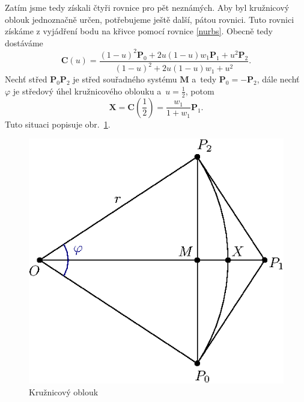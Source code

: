 Zatím jsme tedy získali čtyři rovnice pro pět neznámých. Aby byl kružnicový oblouk jednoznačně určen, potřebujeme ještě další, pátou rovnici. Tuto rovnici získáme z vyjádření bodu na křivce pomocí rovnice \eqref{nurbs}. Obecně tedy dostáváme
\begin{equation}
	\mathbf{C}\left(u\right)=\frac{\left(1-u\right)^2\mathbf{P}_0+2u\left(1-u\right)w_1\mathbf{P}_1+u^2\mathbf{P}_2}{\left(1-u\right)^2+2u\left(1-u\right)w_1+u^2}.
\end{equation}
Nechť střed $\mathbf{P}_0\mathbf{P}_2$ je střed souřadného systému $\mathbf{M}$ a~tedy $\mathbf{P}_0=-\mathbf{P}_2$, dále nechť $\varphi$ je středový úhel kružnicového oblouku a~$u=\frac{1}{2}$, potom
\begin{equation}\label{X=C(1/2)}
	\mathbf{X}=\mathbf{C}\left(\frac{1}{2}\right)=\frac{w_1}{1+w_1}\mathbf{P}_1.
\end{equation}
Tuto situaci popisuje obr.~\ref{oblouk}.
\begin{figure}[!h]
	\begin{center}
	   \includegraphics*[]{obr/oblouk}
	\end{center}
	\caption{Kružnicový oblouk}
	\label{oblouk}
\end{figure}

